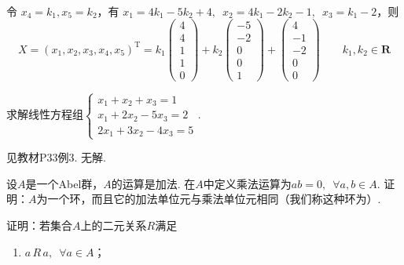 \begin{exercise}
\begin{exgroup}
\begin{answer}
\begin{align*}
            \end{align*}
            令 $ x_4 = k_1, x_5 = k_2 $，有 $x_1 = 4k_1 - 5k_2 + 4,\enspace\allowbreak x_2 = 4k_1 - 2k_2 - 1,\enspace\allowbreak x_3 = k_1 -2 $，则
            \[ X = (x_1, x_2, x_3, x_4, x_5)^\mathrm{T} = k_1 \begin{pmatrix} 4 \\ 4 \\ 1 \\ 1 \\ 0 \end{pmatrix} + k_2 \begin{pmatrix} -5 \\ -2 \\ 0 \\ 0 \\ 1 \end{pmatrix} + \begin{pmatrix} 4 \\ -1 \\ -2 \\ 0 \\ 0 \end{pmatrix} \qquad k_1, k_2 \in \mathbf{R} \]
        \end{answer}

        \item 求解线性方程组$\begin{cases}
                x_1+x_2+x_3=1   \\
                x_1+2x_2-5x_3=2 \\
                2x_1+3x_2-4x_3=5
            \end{cases}$.

        \begin{answer}
            见教材P33例3. 无解.
        \end{answer}
    \end{exgroup}

    \begin{exgroup}
        \item 设$A$是一个Abel群，$A$的运算是加法. 在$A$中定义乘法运算为$ab=0,\enspace\forall a,b\in A$. 证明：$A$为一个环，而且它的加法单位元与乘法单位元相同（我们称这种环为）.

        \item 证明：若集合$A$上的二元关系$R$满足
        \begin{enumerate}
            \item $a\,R\,a,\enspace\forall a\in A$；


\end{enumerate}
\end{exgroup}
\end{exercise}
